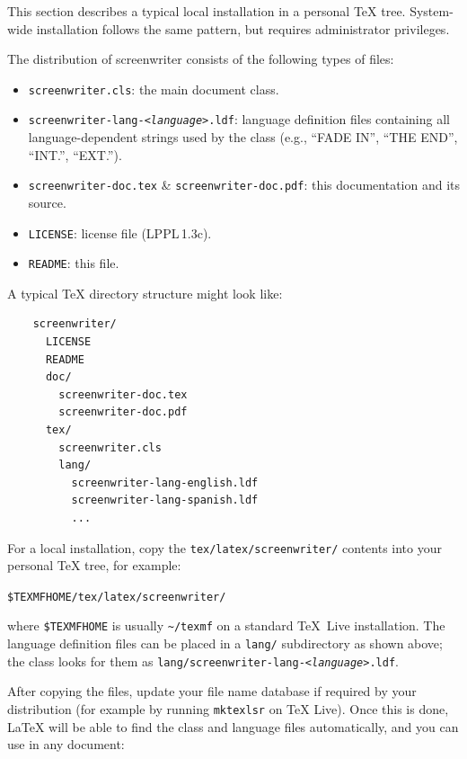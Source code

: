 \documentclass[a4paper]{article}
\newcommand{\meta}[1]{<\textit{#1}>}
\begin{document}
This section describes a typical local installation in a personal \TeX{}
tree.  System-wide installation follows the same pattern, but requires
administrator privileges.

The distribution of \textsf{screenwriter} consists of the following
types of files:

\begin{itemize}\itemsep0em
  \item \texttt{screenwriter.cls}: the main document class.
  \item \texttt{screenwriter-lang-\meta{language}.ldf}: language
        definition files containing all language-dependent strings used
        by the class (e.g., ``FADE IN'', ``THE END'', ``INT.'', ``EXT.'').
  \item \texttt{screenwriter-doc.tex} \& \texttt{screenwriter-doc.pdf}:
        this documentation and its source.
  \item \texttt{LICENSE}: license file (LPPL\,1.3c).
  \item \texttt{README}: this file.
\end{itemize}

A typical \TeX{} directory structure might look like:

\begin{verbatim}
    screenwriter/
      LICENSE
      README
      doc/
        screenwriter-doc.tex
        screenwriter-doc.pdf
      tex/
        screenwriter.cls
        lang/
          screenwriter-lang-english.ldf
          screenwriter-lang-spanish.ldf
          ...
\end{verbatim}

For a local installation, copy the \texttt{tex/latex/screenwriter/}
contents into your personal \TeX{} tree, for example:

\begin{center}
  \texttt{\$TEXMFHOME/tex/latex/screenwriter/}
\end{center}
where \texttt{\$TEXMFHOME} is usually \texttt{\~{}/texmf} on a standard
\TeX{}~Live installation.  The language definition files can be placed
in a \texttt{lang/} subdirectory as shown above; the class looks for
them as \texttt{lang/screenwriter-lang-\meta{language}.ldf}.

After copying the files, update your file name database if required by
your distribution (for example by running \texttt{mktexlsr} on \TeX{}
Live).  Once this is done, \LaTeX{} will be able to find the class and
language files automatically, and you can use in any document:
\end{document}
